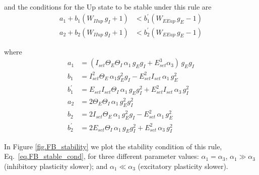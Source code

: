 \documentclass[twocolumn]{article}
\newcommand{\EE}{\mathit{EE}}
\newcommand{\II}{\mathit{II}}
\newcommand{\set}{\mathit{set}}
\newcommand{\up}{\mathit{up}}
\begin{document}
\noindent and the conditions for the Up state to be stable under this rule are
\begin{equation}
\begin{aligned}
a_1 + b_1(W_{\II\up} \, g_I + 1) & < b_1^\prime(W_{\EE\up} \, g_E - 1) \\
a_2 + b_2(W_{\II\up} \, g_I + 1) & < b_2^\prime(W_{\EE\up} \, g_E - 1)
\end{aligned}
\label{eq.FB_stable_cond}
\end{equation}

\noindent where
\begin{displaymath}
\begin{aligned}
a_1 & = (I_{\set} \Theta_E \Theta_I \, \alpha_1 \, g_E g_I + E_{\set}^3 \alpha_3) \, g_E g_I \\
b_1 & = I_{\set}^2 \Theta_E \, \alpha_1 g_E^2 g_I - E_{\set}^2 I_{\set} \, \alpha_1 \, g_E^2 \\
b_1^\prime & = E_{\set} I_{\set} \Theta_I \, \alpha_1 \, g_E g_I^2 + E_{\set}^2 I_{\set} \, \alpha_3 \, g_I^2 \\
a_2 & = 2 \Theta_E \Theta_I \, \alpha_1 \, g_E^2 g_I^2 \\
b_2 & = 2I_{\set} \Theta_E \, \alpha_1 \, g_E^2 g_I - E_{\set}^2 \, \alpha_1 \, g_E^2 \\
b_2^\prime & = 2E_{\set} \Theta_I \, \alpha_1 \, g_E g_I^2 + E_{\set}^2 \, \alpha_3 \, g_I^2
\end{aligned}
\end{displaymath}


In Figure \ref{fig.FB_stability} we plot the stability condition of this rule, Eq.\ \ref{eq.FB_stable_cond}, for three different parameter values: $\alpha_1 = \alpha_3$, $\alpha_1 \gg \alpha_3$ (inhibitory plasticity slower); and $\alpha_1 \ll \alpha_3$ (excitatory plasticity slower).
\end{document}
